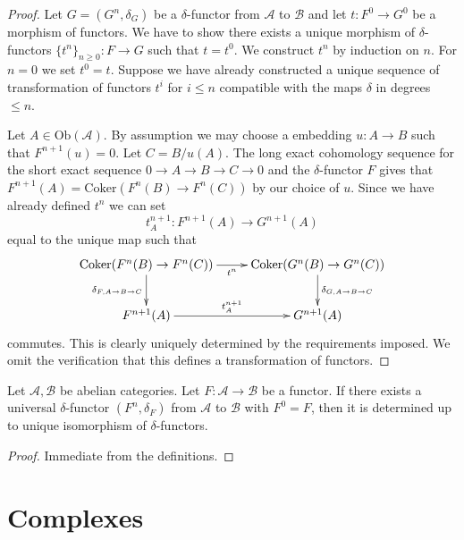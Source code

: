 \begin{proof}
Let $G = (G^n, \delta_G)$ be a $\delta$-functor
from $\mathcal{A}$ to $\mathcal{B}$ and let $t : F^0 \to G^0$
be a morphism of functors. We have to show there exists
a unique morphism of $\delta$-functors $\{t^n\}_{n \geq 0} : F \to G$
such that $t = t^0$. We construct $t^n$ by induction on $n$.
For $n = 0$ we set $t^0 = t$.
Suppose we have already constructed a unique sequence of
transformation of functors $t^i$ for $i \leq n$ compatible with
the maps $\delta$ in degrees $\leq n$.

\medskip\noindent
Let $A \in \text{Ob}(\mathcal{A})$. By assumption we may choose
a embedding $u : A \to B$ such that $F^{n + 1}(u) = 0$.
Let $C = B/u(A)$. The long exact cohomology sequence for
the short exact sequence $0 \to A \to B \to C \to 0$ and the
$\delta$-functor $F$ gives that
$F^{n + 1}(A) = \text{Coker}(F^n(B) \to F^n(C))$ by our choice of $u$.
Since we have already defined $t^n$ we can set
$$
t^{n + 1}_A : F^{n + 1}(A) \to G^{n + 1}(A)
$$
equal to the unique map such that
$$
\xymatrix{
\text{Coker}(F^n(B) \to F^n(C)) \ar[r]_{t^n}
\ar[d]_{\delta_{F, A \to B \to C}} &
\text{Coker}(G^n(B) \to G^n(C))
\ar[d]^{\delta_{G, A \to B \to C}} \\
F^{n + 1}(A) \ar[r]^{t^{n + 1}_A} &
G^{n + 1}(A)
}
$$
commutes. This is clearly uniquely determined by the requirements
imposed. We omit the verification that this defines a transformation
of functors.
\end{proof}

\begin{lemma}
\label{lemma-uniqueness-universal-delta-functor}
Let $\mathcal{A}, \mathcal{B}$ be abelian categories.
Let $F : \mathcal{A} \to \mathcal{B}$ be a functor.
If there exists a universal $\delta$-functor
$(F^n, \delta_F)$ from $\mathcal{A}$ to $\mathcal{B}$
with $F^0 = F$, then it is determined up to unique isomorphism
of $\delta$-functors.
\end{lemma}

\begin{proof}
Immediate from the definitions.
\end{proof}







\section{Complexes}
\label{section-complexes}

